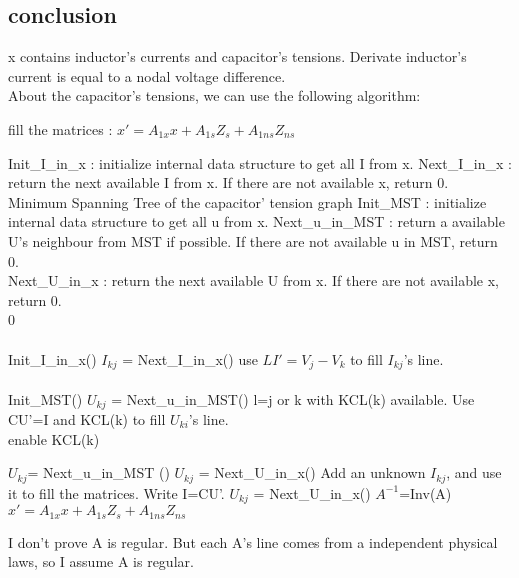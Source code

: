 \documentclass[10pt]{article}
\begin{document}
\subsection{conclusion}
x contains inductor's currents and capacitor's tensions. Derivate inductor's current is equal to a
nodal voltage difference.\\
About the capacitor's tensions, we can use the following algorithm:\\


\begin{algorithm}
\caption{fill the matrices : $x'=A_{1x}x+A_{1s}Z_{s}+A_{1ns}Z_{ns}$ }
\begin{algorithmic}
\REQUIRE Init\_I\_in\_x : initialize internal data structure to get all I from x.
\REQUIRE Next\_I\_in\_x : return the next available I from x. If there are not available x, return 0.\\
\REQUIRE Minimum Spanning Tree of the capacitor' tension graph
\REQUIRE Init\_MST : initialize internal data structure to get all u from x.
\REQUIRE Next\_u\_in\_MST : return a available U's neighbour from MST if possible. If there are not
available u in MST, return 0.\\
\REQUIRE Next\_U\_in\_x : return the next available U from x. If there are not available x, return 0.\\

0\\
\\
\STATE Init\_I\_in\_x()
\STATE $I_{kj}$ = Next\_I\_in\_x()
\STATE use $LI'=V_{j}-V_{k}$ to fill $I_{kj}$'s line.
\ENDWHILE\\
\\
\STATE Init\_MST()
\STATE $U_{kj}$ = Next\_u\_in\_MST()
\STATE l=j or k with KCL(k) available.
\STATE Use CU'=I and KCL(k) to fill $U_{ki}$'s line.\\
\STATE enable KCL(k)

\STATE $U_{kj}$= Next\_u\_in\_MST ()
\ENDWHILE
\STATE $U_{kj}$ = Next\_U\_in\_x()
\STATE Add an unknown $I_{kj}$, and use it to fill the matrices. Write I=CU'.
\STATE $U_{kj}$ = Next\_U\_in\_x()
\ENDWHILE
{}
\STATE $A^{-1}$=Inv(A)
\STATE $x'=A_{1x}x+A_{1s}Z_{s}+A_{1ns}Z_{ns}$
\end{algorithmic}
\end{algorithm}
I don't prove A is regular. But each A's line comes from a independent physical laws, so I assume A
is regular.
\newpage
\end{document}
